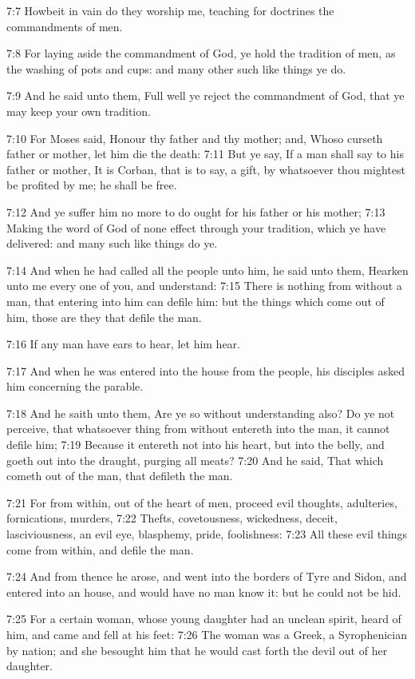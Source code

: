 7:7 Howbeit in vain do they worship me, teaching for doctrines the commandments of men.

7:8 For laying aside the commandment of God, ye hold the tradition of men, as the washing of pots and cups: and many other such like things ye do.

7:9 And he said unto them, Full well ye reject the commandment of God, that ye may keep your own tradition.

7:10 For Moses said, Honour thy father and thy mother; and, Whoso curseth father or mother, let him die the death: 7:11 But ye say, If a man shall say to his father or mother, It is Corban, that is to say, a gift, by whatsoever thou mightest be profited by me; he shall be free.

7:12 And ye suffer him no more to do ought for his father or his mother; 7:13 Making the word of God of none effect through your tradition, which ye have delivered: and many such like things do ye.

7:14 And when he had called all the people unto him, he said unto them, Hearken unto me every one of you, and understand: 7:15 There is nothing from without a man, that entering into him can defile him: but the things which come out of him, those are they that defile the man.

7:16 If any man have ears to hear, let him hear.

7:17 And when he was entered into the house from the people, his disciples asked him concerning the parable.

7:18 And he saith unto them, Are ye so without understanding also? Do ye not perceive, that whatsoever thing from without entereth into the man, it cannot defile him; 7:19 Because it entereth not into his heart, but into the belly, and goeth out into the draught, purging all meats?  7:20 And he said, That which cometh out of the man, that defileth the man.

7:21 For from within, out of the heart of men, proceed evil thoughts, adulteries, fornications, murders, 7:22 Thefts, covetousness, wickedness, deceit, lasciviousness, an evil eye, blasphemy, pride, foolishness: 7:23 All these evil things come from within, and defile the man.

7:24 And from thence he arose, and went into the borders of Tyre and Sidon, and entered into an house, and would have no man know it: but he could not be hid.

7:25 For a certain woman, whose young daughter had an unclean spirit, heard of him, and came and fell at his feet: 7:26 The woman was a Greek, a Syrophenician by nation; and she besought him that he would cast forth the devil out of her daughter.

